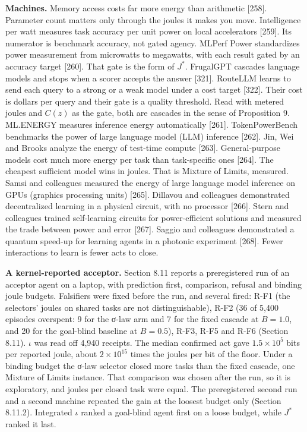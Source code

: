 \documentclass[
  10pt,
]{article}
\begin{document}
\textbf{Machines.} Memory access costs far more energy than arithmetic
{[}258{]}. Parameter count matters only through the joules it makes you
move. Intelligence per watt measures task accuracy per unit power on
local accelerators {[}259{]}. Its numerator is benchmark accuracy, not
gated agency. MLPerf Power standardizes power measurement from
microwatts to megawatts, with each result gated by an accuracy target
{[}260{]}. That gate is the form of \(J^*\). FrugalGPT cascades language
models and stops when a scorer accepts the answer {[}321{]}. RouteLLM
learns to send each query to a strong or a weak model under a cost
target {[}322{]}. Their cost is dollars per query and their gate is a
quality threshold. Read with metered joules and \(C(z)\) as the gate,
both are cascades in the sense of Proposition 9. ML.ENERGY measures
inference energy automatically {[}261{]}. TokenPowerBench benchmarks the
power of large language model (LLM) inference {[}262{]}. Jin, Wei and
Brooks analyze the energy of test-time compute {[}263{]}.
General-purpose models cost much more energy per task than task-specific
ones {[}264{]}. The cheapest sufficient model wins in joules. That is
Mixture of Limits, measured. Samsi and colleagues measured the energy of
large language model inference on GPUs (graphics processing units)
{[}265{]}. Dillavou and colleagues demonstrated decentralized learning
in a physical circuit, with no processor {[}266{]}. Stern and colleagues
trained self-learning circuits for power-efficient solutions and
measured the trade between power and error {[}267{]}. Saggio and
colleagues demonstrated a quantum speed-up for learning agents in a
photonic experiment {[}268{]}. Fewer interactions to learn is fewer acts
to close.

\textbf{A kernel-reported acceptor.} Section 8.11 reports a
preregistered run of an acceptor agent on a laptop, with prediction
first, comparison, refusal and binding joule budgets. Falsifiers were
fixed before the run, and several fired: R-F1 (the selectors' joules on
shared tasks are not distinguishable), R-F2 (36 of 5,400 episodes
overspent: 9 for the σ-law arm and 7 for the fixed cascade at
\(B = 1.0\), and 20 for the goal-blind baseline at \(B = 0.5\)), R-F3,
R-F5 and R-F6 (Section 8.11). \(\iota\) was read off 4,940 receipts. The
median confirmed act gave \(1.5 \times 10^5\) bits per reported joule,
about \(2 \times 10^{15}\) times the joules per bit of the floor. Under
a binding budget the σ-law selector closed more tasks than the fixed
cascade, one Mixture of Limits instance. That comparison was chosen
after the run, so it is exploratory, and joules per closed task were
equal. The preregistered second run and a second machine repeated the
gain at the loosest budget only (Section 8.11.2). Integrated \(\iota\)
ranked a goal-blind agent first on a loose budget, while \(J^*\) ranked
it last.
\end{document}
